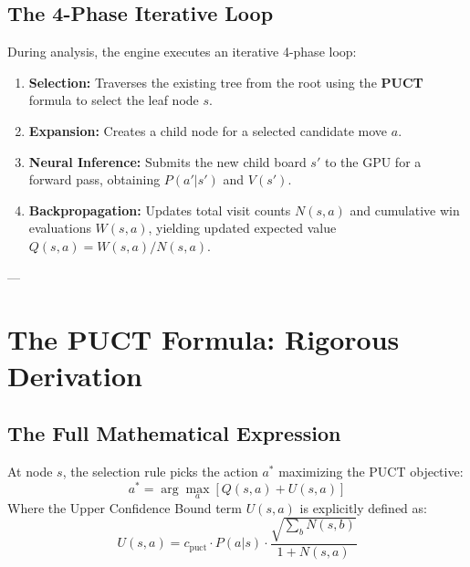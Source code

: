 \documentclass[11pt,a4paper]{article}
\begin{document}
\subsection{The 4-Phase Iterative Loop}
During analysis, the engine executes an iterative 4-phase loop:
\begin{enumerate}
    \item \textbf{Selection:} Traverses the existing tree from the root using the \textbf{PUCT} formula to select the leaf node $s$.
    \item \textbf{Expansion:} Creates a child node for a selected candidate move $a$.
    \item \textbf{Neural Inference:} Submits the new child board $s'$ to the GPU for a forward pass, obtaining $P(a'|s')$ and $V(s')$.
    \item \textbf{Backpropagation:} Updates total visit counts $N(s,a)$ and cumulative win evaluations $W(s,a)$, yielding updated expected value $Q(s,a) = W(s,a)/N(s,a)$.
\end{enumerate}

---

\section{The PUCT Formula: Rigorous Derivation}

\subsection{The Full Mathematical Expression}
At node $s$, the selection rule picks the action $a^*$ maximizing the PUCT objective:
\begin{equation}
a^* = \arg\max_{a} \left[ Q(s,a) + U(s,a) \right]
\end{equation}
Where the Upper Confidence Bound term $U(s,a)$ is explicitly defined as:
\begin{equation}
U(s,a) = c_{\text{puct}} \cdot P(a|s) \cdot \frac{\sqrt{\sum_{b} N(s,b)}}{1 + N(s,a)}
\end{equation}
\end{document}
